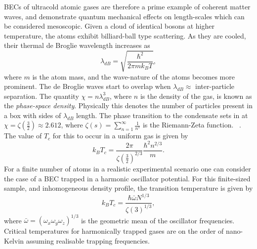 BECs of ultracold atomic gases are therefore a prime example of coherent matter waves, and demonstrate quantum mechanical effects on length-scales which can be considered mesoscopic. Given a cloud of identical bosons at higher temperature, the atoms exhibit billiard-ball type scattering. As they are cooled, their thermal de Broglie wavelength increases as
\begin{equation}
\lambda_{dB} = \sqrt{\frac{\hbar^2}{2\pi mk_{B}T}},
\end{equation}
where $m$ is the atom mass, and the wave-nature of the atoms becomes more prominent. The de Broglie waves start to overlap when $\lambda_{dB} \approx$ inter-particle separation. The quantity $\chi=n\lambda_{dB}^3$, where $n$ is the density of the gas, is known as the \emph{phase-space density}. Physically this denotes the number of particles present in a box with sides of $\lambda_{dB}$ length. The phase transition to the condensate sets in at $\chi = \zeta\left(\frac{3}{2}\right)\approx 2.612$, where $\zeta(s) = \displaystyle\sum\limits_{n=1}^{\infty}\frac{1}{n^s}$ is the Riemann-Zeta function. ~\cite{BK:Ueda_2010}. The value of $T_c$ for this to occur in a uniform gas is given by
\begin{equation}
k_BT_c = \frac{2\pi}{\zeta\left(\frac{3}{2}\right)^{2/3}}\frac{\hbar^2n^{2/3}}{m}.
\end{equation}
For a finite number of atoms in a realistic experimental scenario one can consider the case of a BEC trapped in a harmonic oscillator potential. For this finite-sized sample, and inhomogeneous density profile, the transition temperature is given by
\begin{equation}
k_BT_c = \frac{\hbar\bar{\omega}N^{1/3}}{\zeta(3)^{1/3}},
\end{equation}
where $\bar{\omega}=(\omega_x\omega_y\omega_z)^{1/3}$ is the geometric mean of the oscillator frequencies. Critical temperatures for harmonically trapped gases are on the order of nano-Kelvin assuming realisable trapping frequencies.

